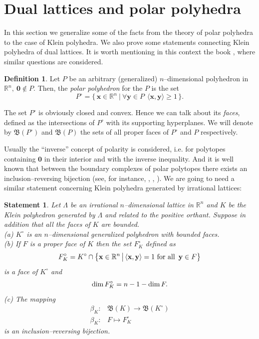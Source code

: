 \documentclass[11pt]{article}
\theoremstyle{definition}
\newtheorem{definition}{Definition}
\theoremstyle{remark}
\theoremstyle{plain}
\newtheorem{statement}{Statement}
\renewcommand{\vec}[1]{\mathbf{#1}}
\renewcommand{\geq}{\geqslant}
\renewcommand{\dim}{\textup{dim\,}}
\renewcommand{\dim}{\textup{dim\,}}
\newcommand{\La}{\Lambda}
\newcommand{\R}{\mathbb{R}}
\newcommand{\faces}{\mathfrak B}
\begin{document}
  \section{Dual lattices and polar polyhedra}




  In this section we generalize some of the facts from the theory of polar polyhedra to the
  case of Klein polyhedra. We also prove some statements connecting Klein polyhedra of dual
  lattices. It is worth mentioning in this context the book \cite{lachaud_unseen}, where
  similar questions are considered.

  \begin{definition} \label{d:polar_polyhedron}
    Let $P$ be an arbitrary (generalized) $n$--dimensional polyhedron in
    $\R^n,\ \vec 0\notin P$. Then, the \emph{polar polyhedron} for the $P$ is the set
    \[ P^\circ=\big\{\, \vec x\in\R^n\ \big|\ \forall\vec y\in P\ \
       \langle\vec x,\vec y\rangle\geq 1 \,\big\}. \]
  \end{definition}

  The set $P^\circ$ is obviously closed and convex. Hence we can talk about its \emph{faces},
  defined as the intersections of $P^\circ$ with its supporting hyperplanes. We will denote
  by $\faces(P^\circ)$ and $\faces(P)$ the sets of all proper faces of $P^\circ$ and $P$
  respectively.

  Usually the ``inverse'' concept of polarity is considered, i.e. for polytopes containing
  $\vec 0$ in their interior and with the inverse inequality. And it is well known that
  between the boundary complexes of polar polytopes there exists an inclusion--reversing
  bijection (see, for instance, \cite{grunbaum}, \cite{mcmullen_shephard}, \cite{ewald}). We
  are going to need a similar statement concerning Klein polyhedra generated by irrational
  lattices:

  \begin{statement} \label{st:polar_correspondence_Klein_polyhedra}
    Let $\La$ be an irrational $n$--dimensional lattice in $\R^n$ and $K$ be the Klein
    polyhedron generated by $\La$ and related to the positive orthant. Suppose in addition
    that all the faces of $K$ are bounded. \\
    (a) $K^\circ$ is an $n$--dimensional generalized polyhedron with bounded faces. \\
    (b) If $F$ is a proper face of $K$ then the set $F_K^\circ$ defined as
        \[ F_K^\circ=K^\circ\cap\big\{ \vec x\in\R^n\, \big|\, \langle\vec x,\vec y\rangle=1
           \text{ for all\,\ }\vec y\in F \big\} \]
        is a face of $K^\circ$ and
        \[ \dim F_K^\circ=n-1-\dim F. \]
    (c) The mapping
        \[ \begin{array}{rc}
             \beta_K: & \faces(K)\rightarrow\faces(K^\circ) \\
             \beta_K: & F\mapsto F_K^\circ
           \end{array} \]
        is an inclusion--reversing bijection.
  \end{statement}
\end{document}
